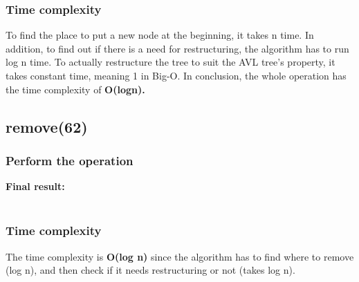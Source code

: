 \subsubsection{Time complexity}
To find the place to put a new node at the beginning, it takes n time. In addition, to find out if there is a need for restructuring, the algorithm has to run log n time. To actually restructure the tree to suit the AVL tree's property, it takes constant time, meaning 1 in Big-O. In conclusion, the whole operation has the time complexity of \textbf{O(logn).}

\subsection{remove(62)}
\subsubsection{Perform the operation}
\textbf{Final result:}
\\
\\

\subsubsection{Time complexity}
The time complexity is \textbf{O(log n)} since the algorithm has to find where to remove (log n), and then check if it needs restructuring or not (takes log n).

